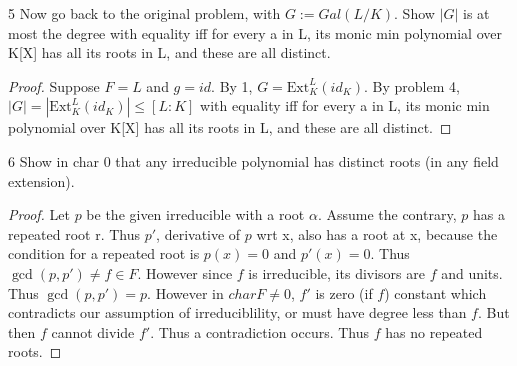 \documentclass{article}
\newcommand{\ext}[2]{\text{Ext}_{#1}^{#2}}
\begin{document}
\bigskip

\begin{PROB}{5}\label{Problem 5.}
    Now go back to the original problem, with $G := Gal(L/K)$. Show $|G|$ is at most the degree with equality iff for every a in L, its monic min polynomial over K[X] has all its roots in L, and  these are all distinct. 
\end{PROB}
\begin{proof}
    Suppose $F = L$ and $g = id$. By 1, $G = \ext{K}{L}(id_K)$. By problem 4, $|G| = |\ext{K}{L}(id_K)| \leq [L : K]$ with equality iff for every a in L, its monic min polynomial over K[X] has all its roots in L, and  these are all distinct.   
\end{proof}

\begin{PROB}{6}\label{Problem 6.}
    Show in char 0 that any irreducible polynomial has distinct roots (in any field extension).
\end{PROB}
\begin{proof}
    Let $p$ be the given irreducible with a root $\alpha$. Assume the contrary, $p$ has a repeated root r. Thus $p'$, derivative of $p$ wrt x, also has a root at x, because the condition for a repeated root is $p(x) = 0$ and $p'(x) = 0$. Thus $\gcd(p, p') \neq f \in F$. However since $f$ is irreducible, its divisors are $f$ and units. Thus $\gcd(p, p') = p$. However in $char F \neq 0$, $f'$ is zero (if $f$) constant which contradicts our assumption of irreduciblility, or must have degree less than $f$. But then $f$ cannot divide $f'$. Thus a contradiction occurs. Thus $f$  has no repeated roots.     
\end{proof}
\end{document}
